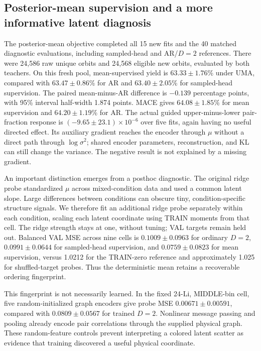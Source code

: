 \subsection{Posterior-mean supervision and a more informative latent diagnosis}
The posterior-mean objective completed all 15 new fits and the 40 matched
diagnostic evaluations, including sampled-head and AR/$D=2$ references.
There were 24,586 raw unique orbits and 24,568 eligible new orbits, evaluated
by both teachers. On this fresh pool, mean-supervised yield is
$63.33\pm1.76$\% under UMA, compared with $63.47\pm0.86$\% for AR and
$63.40\pm2.05$\% for sampled-head supervision. The paired mean-minus-AR
difference is $-0.139$ percentage points, with 95\% interval half-width
1.874 points. MACE gives $64.08\pm1.85$\% for mean supervision and
$64.20\pm1.19$\% for AR. The actual guided upper-minus-lower pair-fraction
response is $(-9.65\pm23.1)\times10^{-6}$ over five fits, again having no
useful directed effect. Its auxiliary gradient reaches the encoder through
$\mu$ without a direct path through $\log\sigma^2$; shared encoder parameters,
reconstruction, and KL can still change the variance. The negative result
is not explained by a missing gradient.

An important distinction emerges from a posthoc diagnostic. The original
ridge probe standardized $\mu$ across mixed-condition data and used a common
latent slope. Large differences between conditions can obscure tiny,
condition-specific structure signals. We therefore fit an additional ridge
probe separately within each condition, scaling each latent coordinate using
TRAIN moments from that cell. The ridge strength stays at one, without
tuning; VAL targets remain held out. Balanced VAL MSE across nine cells is
$0.1009\pm0.0963$ for ordinary $D=2$, $0.0991\pm0.0644$ for sampled-head
supervision, and $0.0759\pm0.0823$ for mean supervision, versus 1.0212 for
the TRAIN-zero reference and approximately 1.025 for shuffled-target probes.
Thus the deterministic mean retains a recoverable ordering fingerprint.

This fingerprint is not necessarily learned. In the fixed 24-Li, MIDDLE-bin
cell, five random-initialized graph encoders give probe MSE
$0.00671\pm0.00591$, compared with $0.0809\pm0.0567$ for trained $D=2$.
Nonlinear message passing and pooling already encode pair correlations
through the supplied physical graph. These random-feature controls prevent
interpreting a colored latent scatter as evidence that training discovered a
useful physical coordinate.

